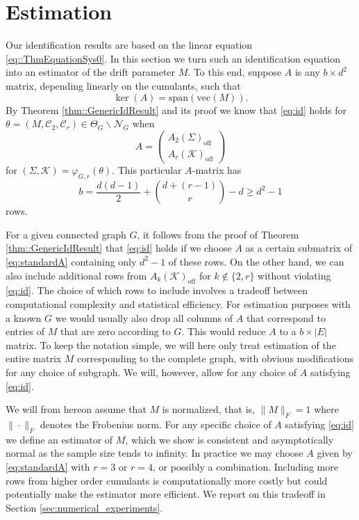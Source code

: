 \documentclass{biometrika}
\begin{document}
\section{Estimation}
\label{sec::Estimation}

Our identification results are based on the linear equation \eqref{eq::ThmEquationSys0}. 
In this section we turn such an identification equation into an estimator 
of the drift parameter $M$. To this end, suppose $A$ is any $b \times d^2$ matrix, 
depending linearly on the cumulants, such that 
\begin{equation}
    \label{eq:id}
    \ker(A) = \mathrm{span}(\mathrm{vec}(M)).
\end{equation}
By Theorem \ref{thm::GenericIdResult} and its proof we know that \eqref{eq:id} holds for 
$\theta = (M, \mathcal{C}_2, \mathcal{C}_r) \in \Theta_G \backslash \mathcal{N}_G$ when
\begin{equation} \label{eq:standardA}
       A =
       \begin{pmatrix}
            A_2(\Sigma)_{\mathrm{off}}\\ 
            A_r(\mathcal{K} )_{\mathrm{off}} 
    \end{pmatrix}
\end{equation}
for $(\Sigma, \mathcal{K} ) = \varphi_{G, r}(\theta)$. This particular $A$-matrix has
$$
    b = \frac{d(d-1)}{2} + \binom{d+(r-1)}{r} - d \geq d^2 - 1 
$$
rows. 

For a given connected graph $G$, it follows from the proof of 
Theorem \ref{thm::GenericIdResult} that \eqref{eq:id} holds if we choose $A$ as a 
certain submatrix of \eqref{eq:standardA} containing only $d^2 - 1$ of these rows. 
On the other hand, we can also 
include additional rows from $A_{k}(\mathcal{K} )_{\mathrm{off}}$ for $k \not \in \{2, r\}$ without violating 
\eqref{eq:id}. The choice of which rows to include involves a tradeoff between computational 
complexity and statistical efficiency. For estimation purposes with a known $G$ 
we would usually also drop all columns of $A$ 
that correspond to entries of $M$ that are zero according to $G$. This would reduce $A$ to a 
$b \times |E|$ matrix. To keep the notation simple, we will here only treat estimation of 
the entire matrix $M$ corresponding to the complete graph, with obvious modifications for any 
choice of subgraph. We will, however, allow for any choice of $A$ satisfying \eqref{eq:id}.

We will from hereon assume that $M$ is normalized, that is, $\| M \|_F = 1$ where $\| \cdot \|_F$ 
denotes the Frobenius norm. 
For any specific choice of $A$ satisfying \eqref{eq:id} we define an estimator 
of $M$, which we show is consistent and asymptotically normal as the sample size tends to infinity. 
In practice we may choose $A$ given by \eqref{eq:standardA} 
with $r = 3$ or $r = 4$, or possibly a combination. Including more rows from higher order 
cumulants is computationally more costly but could potentially make the estimator more 
efficient. We report on this tradeoff in Section \ref{sec:numerical_experiments}.
\end{document}

